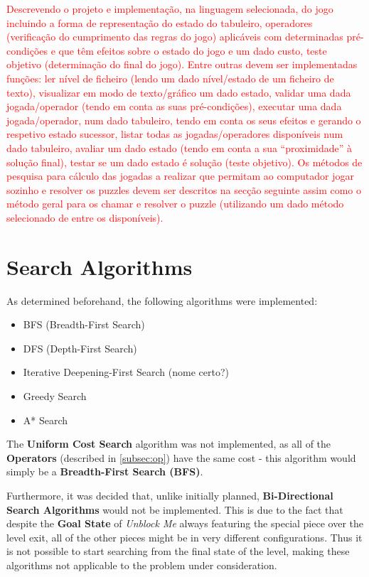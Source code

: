 \documentclass[conference]{IEEEtran}
\begin{document}
\textcolor{red}{Descrevendo o projeto e implementação, na linguagem selecionada, do jogo incluindo a forma de representação do estado do tabuleiro, operadores (verificação do cumprimento das regras do jogo) aplicáveis com determinadas pré-condições e que têm efeitos sobre o estado do jogo e um dado custo, teste objetivo (determinação do final do jogo). Entre outras devem ser implementadas funções: ler nível de ficheiro (lendo um dado nível/estado de um ficheiro de texto), visualizar em modo de texto/gráfico um dado estado, validar uma dada jogada/operador (tendo em conta as suas pré-condições), executar uma dada jogada/operador, num dado tabuleiro, tendo em conta os seus efeitos e gerando o respetivo estado sucessor, listar todas as jogadas/operadores disponíveis num dado tabuleiro, avaliar um dado estado (tendo em conta a sua “proximidade” à solução final), testar se um dado estado é solução (teste objetivo). Os métodos de pesquisa para cálculo das jogadas a realizar que permitam ao computador jogar sozinho e resolver os puzzles devem ser descritos na secção seguinte assim como o método geral para os chamar e resolver o puzzle (utilizando um dado método selecionado de entre os disponíveis).}

\section{Search Algorithms} \label{sec:sa}
As determined beforehand, the following algorithms were implemented:
\begin{itemize}
    \item BFS (Breadth-First Search)
    \item DFS (Depth-First Search)
    \item Iterative Deepening-First Search (nome certo?)
    \item Greedy Search
    \item A* Search
\end{itemize}

The \textbf{Uniform Cost Search} algorithm was not implemented, as all of the \textbf{Operators} (described in \autoref{subsec:op}) have the same cost - this algorithm would simply be a \textbf{Breadth-First Search (BFS)}.

Furthermore, it was decided that, unlike initially planned, \textbf{Bi-Directional Search Algorithms} would not be implemented. This is due to the fact that despite the \textbf{Goal State} of \textit{Unblock Me} always featuring the special piece over the level exit, all of the other pieces might be in very different configurations. Thus it is not possible to start searching from the final state of the level, making these algorithms not applicable to the problem under consideration.
\end{document}
